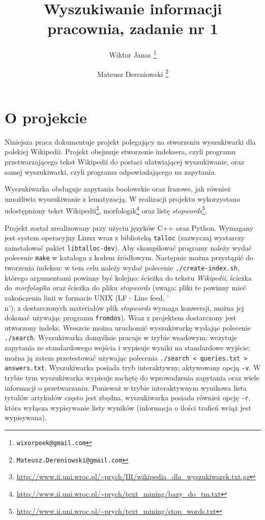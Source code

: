\documentclass[a4paper,12pt]{article}
\title{\textbf{Wyszukiwanie informacji} \\ pracownia, zadanie nr 1}
\author{
Wiktor Janas \thanks{\texttt{wixorpeek@gmail.com}}
\and
Mateusz Dereniowski \thanks{\texttt{Mateusz.Dereniowski@gmail.com}}}
\begin{document}
\maketitle
\thispagestyle{empty}

\tableofcontents

\newpage

\section{O projekcie}
Niniejsza praca dokumentuje projekt polegający na stworzeniu wyszukiwarki dla
polskiej Wikipedii. Projekt obejmuje stworzenie indeksera, czyli programu
przetwarzającego tekst Wikipedii do postaci ułatwiającej wyszukiwanie, oraz
samej wyszukiwarki, czyli programu odpowiadającego na zapytania.

Wyszukiwarka obsługuje zapytania boolowskie oraz frazowe, jak również umożliwia
wyszukiwanie z lematyzacją. W realizacji projektu wykorzystano udostępniony
tekst Wikipedii\footnote{\url{http://www.ii.uni.wroc.pl/~prych/IR/wikipedia_dla_wyszukiwarek.txt.gz}},
morfologik\footnote{\url{http://www.ii.uni.wroc.pl/~prych/text\_mining/bazy_do_tm.txt}}
oraz listę \textit{stopwords}\footnote{\url{http://www.ii.uni.wroc.pl/~prych/text_mining/stop_words.txt}}.

Projekt został zrealizowany przy użyciu języków C++ oraz Python. Wymagany jest
system operacyjny Linux wraz z biblioteką \texttt{talloc} (zazwyczaj wystarczy
zainstalować pakiet \texttt{libtalloc-dev}). Aby skompilować programy należy
wydać polecenie \texttt{make} w katalogu z kodem źródłowym. Następnie można
przystąpić do tworzenia indeksu: w tem celu należy wydać polecenie
\texttt{./create-index.sh}, którego argumentami powinny być kolejno:
ścieżka do tekstu \textit{Wikipedii}, ścieżka do \textit{morfologika} oraz ścieżka do pliku
\textit{stopwords} (uwaga: pliki te powinny mieć zakończenia linii w formacie
UNIX (LF - Line feed, '\\n'); z dostarczonych materiałów plik \textit{stopwords} wymaga konwersji,
można jej dokonać używając programu \texttt{fromdos}). Wraz z projektem
dostarczony jest utworzony indeks. Wreszcie można uruchomić wyszukiwarkę
wydając polecenie \texttt{./search}. Wyszukiwarka domyślnie pracuje w trybie
wsadowym: wczytuje zapytania ze standardowego wejścia i wypisuje wyniki na
standardowe wyjście; można ją zatem przetestować używając polecenia
\texttt{./search < queries.txt > answers.txt}. Wyszukiwarka posiada tryb
interaktywny, aktywowany opcją \texttt{-v}. W trybie tym wyszukiwarka wypisuje
zachętę do wprowadzenia zapytania oraz wiele informacji o przetwarzaniu.
Ponieważ w trybie interaktywnym wynikowa lista tytułów artykułów często jest
zbędna, wyszukiwarka posiada również opcję \texttt{-r}, która wyłącza
wypisywanie listy wyników (informacja o ilości trafień wciąż jest wypisywana).
\end{document}
